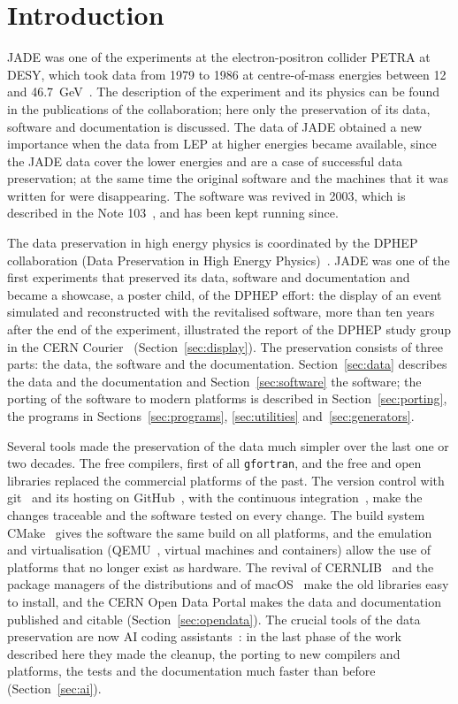 \section{Introduction}

JADE was one of the experiments at the electron-positron collider PETRA at DESY, which took data from 1979 to 1986 at
centre-of-mass energies between 12 and 46.7~GeV~\cite{Bartel:1986ua}. The description of the experiment and its physics
can be found in the publications of the collaboration; here only the preservation of its data, software and documentation is discussed.
The data of JADE obtained a new importance when the data from LEP at higher energies became available, since the JADE data cover the lower energies and are a case of successful data preservation;
at the same time the original software and the machines that it was written for were disappearing.
The software was revived in 2003, which is described in the Note 103~\cite{JCN:103}, and has been kept running since.

The data preservation in high energy physics is coordinated by the DPHEP collaboration (Data Preservation in High Energy Physics)~\cite{Akopov:2012dpHEP}.
JADE was one of the first experiments that preserved its data, software and documentation and became a showcase, a poster child, of the
DPHEP effort: the display of an event simulated and reconstructed with the revitalised software, more than ten years after the end of
the experiment, illustrated the report of the DPHEP study group in the CERN Courier~\cite{Courier:2009datapres} (Section~\ref{sec:display}). The preservation consists of
three parts: the data, the software and the documentation. Section~\ref{sec:data} describes the data and the documentation and Section~\ref{sec:software} the software;
the porting of the software to modern platforms is described in Section~\ref{sec:porting}, the programs in Sections~\ref{sec:programs}, \ref{sec:utilities} and~\ref{sec:generators}.

Several tools made the preservation of the data much simpler over the last one or two decades. The free compilers, first of all \texttt{gfortran}, and
the free and open libraries replaced the commercial platforms of the past. The version control with git~\cite{Git:web} and its hosting on GitHub~\cite{GitHub:web}, with the
continuous integration~\cite{GitHubActions:web}, make the changes traceable and the software tested on every change. The build system CMake~\cite{CMake:web} gives the
software the same build on all platforms, and the emulation and virtualisation (QEMU~\cite{Bellard:2005qemu}, virtual machines and containers) allow
the use of platforms that no longer exist as hardware. The revival of CERNLIB~\cite{Hahn:2022hrpms} and the package managers of the distributions and of macOS~\cite{Homebrew:web}
make the old libraries easy to install, and the CERN Open Data Portal makes the data and documentation published and citable (Section~\ref{sec:opendata}).
The crucial tools of the data preservation are now AI coding assistants~\cite{ClaudeCode:web}: in the last phase of the work described here they made the cleanup,
the porting to new compilers and platforms, the tests and the documentation much faster than before (Section~\ref{sec:ai}).


